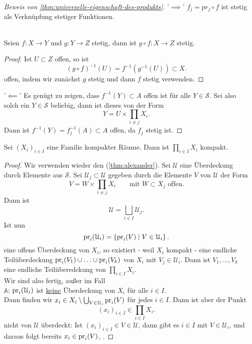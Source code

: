     \begin{proof}[Beweis von \autoref{thm:universelle-eigenschaft-des-produkts}]
'$\implies$' $f_j = pr_j \circ  f$ ist stetig als Verknüpfung stetiger Funktionen.
    \begin{recap}
        \\
        Seien $f:X\to Y$ und $g:Y\to Z$ stetig, dann ist $g\circ  f : X \to  Z$ stetig.
        \begin{proof}
            Ist $U\subset Z$ offen, so ist
            \[
                (g \circ  f) ^{-1}(U) = f^{-1}(g^{-1}(U)) \subset X
            .\] 
            offen, indem wir zunächst $g$ stetig und dann  $f$ stetig verwenden.
        \end{proof}
    \end{recap}
    '$\impliedby$' Es genügt zu zeigen, dass $f^{-1}(Y)\subset A$ offen ist für alle $Y\in \mathcal{S}$. Sei also solch ein $Y\in \mathcal{S}$ beliebig, dann ist dieses von der Form
    \[
    Y = U\times \prod_{i\neq j} X_i
    .\] 
    Dann ist $f^{-1}(Y) = f^{-1}_j(A)\subset A$ offen, da $f_j$ stetig ist.
\end{proof}
\begin{theorem}\label{thm:tychonoff}
    Sei $(X_i)_{i \in I}$ eine Familie kompakter Räume. Dann ist $\prod _{i \in I} X_i$ kompakt.
\end{theorem}
\begin{proof}
    Wir verwenden wieder den  (\autoref{thm:alexander}). Sei $\mathcal{U}$ eine Überdeckung durch Elemente aus  $\mathcal{S}$. Sei $\mathcal{U}_j \subset \mathcal{U}$ gegeben durch die Elemente $V$ von  $\mathcal{U}$ der Form
    \[
    V = W \times \prod_{i\neq j} X_i \qquad \text{mit } W\subset X_j \text{ offen}
    .\] 
    Dann ist
    \[
    \mathcal{U} = \bigsqcup_{i \in  I} \mathcal{U}_j
    .\] 
    Ist nun
    \[
        \operatorname{pr}_i (\mathcal{U}_i)  = \left \{\operatorname{pr}_i(V) \mid  V\in \mathcal{U}_i\right\} 
    .\] 
    eine offene Überdeckung von $X_i$, so existiert - weil  $X_i$ kompakt - eine endliche Teilüberdeckung  $\operatorname{pr}_i(V_1)\cup \ldots\cup \operatorname{pr}_i(V_k)$ von $X_i$ mit  $V_j \in \mathcal{U}_i$. Dann ist $V_1,\ldots,V_k$ eine endliche Teilüberedckung von $\prod_{i \in I} X_i$. \\
    Wir sind also fertig, außer im Fall \\
    $\mathbb{A}$: $\operatorname{pr}_i(\mathcal{U}_i)$ ist  \underline{keine} Überdeckung von $X_i$ für alle  $i\in I$.  \\
    Dann finden wir $x_i \in X_i \setminus \bigcup_{V\in \mathcal{U}_i} \operatorname{pr}_i(V)$ für jedes $i\in I$. Dann ist aber der Punkt
    \[
        (x_i)_{i \in I}\in \prod_{i \in I}X_i
    .\] 
    nicht von $\mathcal{U}$ überdeckt: Ist $(x_i)_{i \in I} \in V\in \mathcal{U}$, dann gibt es $i\in I$ mit $V\in \mathcal{U}_i$, und daraus folgt bereits $x_i \in \operatorname{pr}_i(V)$, \contra.
\end{proof}
